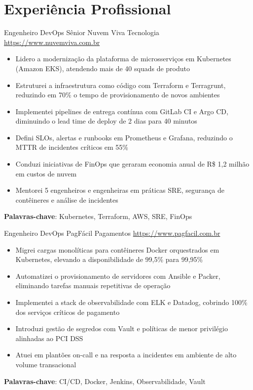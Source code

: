 \documentclass[a4paper, serif, 10pt]{moderncv}
\begin{document}
\section{Experiência Profissional}

        {Engenheiro DevOps Sênior}
        {Nuvem Viva Tecnologia}
        {\url{https://www.nuvemviva.com.br}}
        {}
        {\begin{itemize}
\item Lidero a modernização da plataforma de microsserviços em Kubernetes (Amazon EKS), atendendo mais de 40 squads de produto
\item Estruturei a infraestrutura como código com Terraform e Terragrunt, reduzindo em 70\% o tempo de provisionamento de novos ambientes
\item Implementei pipelines de entrega contínua com GitLab CI e Argo CD, diminuindo o lead time de deploy de 2 dias para 40 minutos
\item Defini SLOs, alertas e runbooks em Prometheus e Grafana, reduzindo o MTTR de incidentes críticos em 55\%
\item Conduzi iniciativas de FinOps que geraram economia anual de R\$ 1,2 milhão em custos de nuvem
\item Mentorei 5 engenheiros e engenheiras em práticas SRE, segurança de contêineres e análise de incidentes
\end{itemize}
\textbf{Palavras-chave}: Kubernetes, Terraform, AWS, SRE, FinOps}

        {Engenheiro DevOps}
        {PagFácil Pagamentos}
        {\url{https://www.pagfacil.com.br}}
        {}
        {\begin{itemize}
\item Migrei cargas monolíticas para contêineres Docker orquestrados em Kubernetes, elevando a disponibilidade de 99,5\% para 99,95\%
\item Automatizei o provisionamento de servidores com Ansible e Packer, eliminando tarefas manuais repetitivas de operação
\item Implementei a stack de observabilidade com ELK e Datadog, cobrindo 100\% dos serviços críticos de pagamento
\item Introduzi gestão de segredos com Vault e políticas de menor privilégio alinhadas ao PCI DSS
\item Atuei em plantões on-call e na resposta a incidentes em ambiente de alto volume transacional
\end{itemize}
\textbf{Palavras-chave}: CI/CD, Docker, Jenkins, Observabilidade, Vault}
\end{document}
